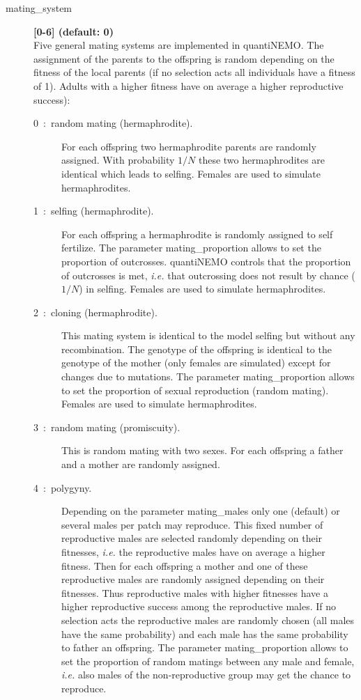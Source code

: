 \documentclass[letterpaper,12pt,oneside]{book}
\begin{document}
\begin{description}

\item[mating\_system]\textbf{[0-6] (default: 0)}\\
Five general mating systems are implemented in quantiNEMO. The assignment of the parents to the offspring is random depending on the fitness of the local parents (if no selection acts all individuals have a fitness of 1). Adults with a higher fitness have on average a higher reproductive success):

\begin{description}
\item [0~:~random mating (hermaphrodite).] For each offspring two hermaphrodite parents are randomly assigned. With probability $1/N$ these two hermaphrodites are identical which leads to selfing. Females are used to simulate hermaphrodites. 

\item [1~:~selfing (hermaphrodite).] For each offspring a hermaphrodite is randomly assigned to self fertilize. The parameter \textsf{mating\_proportion} allows to set the proportion of outcrosses. quantiNEMO controls that the proportion of outcrosses is met, \textit{i.e.} that outcrossing does not result by chance ($1/N$) in selfing. Females are used to simulate hermaphrodites.

\item [2~:~cloning (hermaphrodite).] This mating system is identical to the model selfing but without any recombination. The genotype of the offspring is identical to the genotype of the mother (only females are simulated) except for changes due to mutations. The parameter \textsf{mating\_proportion} allows to set the proportion of sexual reproduction (random mating). Females are used to simulate hermaphrodites.

\item [3~:~random mating (promiscuity).] This is random mating with two sexes. For each offspring a father and a mother are randomly assigned.

\item [4~:~polygyny.] Depending on the parameter \textsf{mating\_males} only one (default) or several males per patch may reproduce. This fixed number of reproductive males are selected randomly depending on their fitnesses, \textit{i.e.} the reproductive males have on average a higher fitness. Then for each offspring a mother and one of these reproductive males are randomly assigned depending on their fitnesses. Thus reproductive males with higher fitnesses have a higher reproductive success among the reproductive males. If no selection acts the reproductive males are randomly chosen (all males have the same probability) and each male has the same probability to father an offspring. The parameter \textsf{mating\_proportion} allows to set the proportion of random matings between any male and female, \textit{i.e.} also males of the non-reproductive group may get the chance to reproduce.


\end{description}
\end{description}
\end{document}
